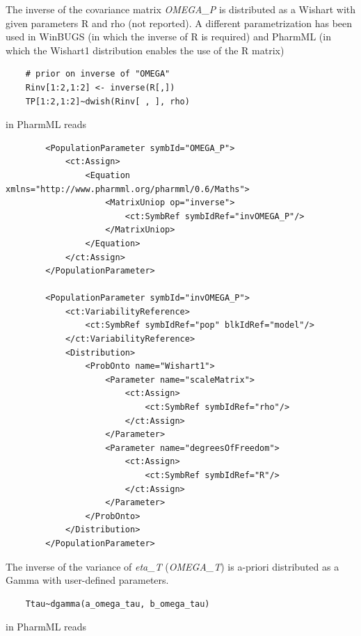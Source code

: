 The inverse of the covariance matrix \emph{OMEGA\_P} is distributed as a Wishart with given parameters R and rho (not reported). A different parametrization has been used in WinBUGS (in which the inverse of R is required) and PharmML (in which the Wishart1 distribution enables the use of the R matrix)
\lstset{language=MLX}
\begin{lstlisting}
	# prior on inverse of "OMEGA"
	Rinv[1:2,1:2] <- inverse(R[,])
	TP[1:2,1:2]~dwish(Rinv[ , ], rho)
\end{lstlisting}
in PharmML reads
\lstset{language=XML}
\begin{lstlisting}
        <PopulationParameter symbId="OMEGA_P">
            <ct:Assign>
                <Equation xmlns="http://www.pharmml.org/pharmml/0.6/Maths">
                    <MatrixUniop op="inverse">
                        <ct:SymbRef symbIdRef="invOMEGA_P"/>
                    </MatrixUniop>
                </Equation>
            </ct:Assign>
        </PopulationParameter>
        
        <PopulationParameter symbId="invOMEGA_P">
            <ct:VariabilityReference>
                <ct:SymbRef symbIdRef="pop" blkIdRef="model"/>
            </ct:VariabilityReference>
            <Distribution>
                <ProbOnto name="Wishart1">
                    <Parameter name="scaleMatrix">
                        <ct:Assign>
                            <ct:SymbRef symbIdRef="rho"/>
                        </ct:Assign>
                    </Parameter>
                    <Parameter name="degreesOfFreedom">
                        <ct:Assign>
                            <ct:SymbRef symbIdRef="R"/>
                        </ct:Assign>
                    </Parameter>
                </ProbOnto>
            </Distribution>
        </PopulationParameter>
\end{lstlisting}
The inverse of the variance of \emph{eta\_T} (\emph{OMEGA\_T}) is a-priori distributed as a Gamma with user-defined parameters.
\lstset{language=MLX}
\begin{lstlisting}
	Ttau~dgamma(a_omega_tau, b_omega_tau)
\end{lstlisting}
in PharmML reads
\lstset{language=XML}
